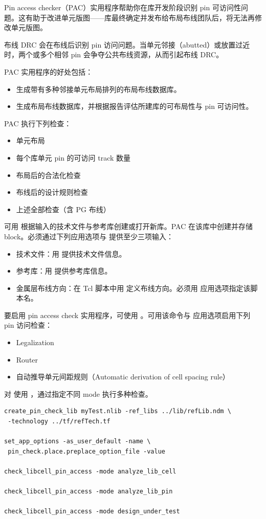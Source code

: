 Pin access checker（PAC）实用程序帮助你在库开发阶段识别 pin 可访问性问题。这有助于改进单元版图——库最终确定并发布给布局布线团队后，将无法再修改单元版图。

布线 DRC 会在布线后识别 pin 访问问题。当单元邻接（abutted）或放置过近时，两个或多个相邻 pin 会争夺公共布线资源，从而引起布线 DRC。

PAC 实用程序的好处包括：
\begin{itemize}
  \item 生成带有多种邻接单元布局排列的布局布线数据库。
  \item 生成布局布线数据库，并根据报告评估所建库的可布局性与 pin 可访问性。
\end{itemize}

PAC 执行下列检查：
\begin{itemize}
  \item 单元布局
  \item 每个库单元 pin 的可访问 track 数量
  \item 布局后的合法化检查
  \item 布线后的设计规则检查
  \item 上述全部检查（含 PG 布线）
\end{itemize}

可用  根据输入的技术文件与参考库创建或打开新库。PAC 在该库中创建并存储 block。必须通过下列应用选项与  提供至少三项输入：
\begin{itemize}
  \item 技术文件：用  提供技术文件信息。
  \item 参考库：用  提供参考库信息。
  \item 金属层布线方向：在 Tcl 脚本中用  定义布线方向。必须用  应用选项指定该脚本名。
\end{itemize}

要启用 pin access check 实用程序，可使用 。可用该命令与  应用选项启用下列 pin 访问检查：
\begin{itemize}
  \item Legalization
  \item Router
  \item 自动推导单元间距规则（Automatic derivation of cell spacing rule）
\end{itemize}

对  使用 ，通过指定不同 mode 执行多种检查。
\begin{lstlisting}
create_pin_check_lib myTest.nlib -ref_libs ../lib/refLib.ndm \
 -technology ../tf/refTech.tf

set_app_options -as_user_default -name \
 pin_check.place.preplace_option_file -value

check_libcell_pin_access -mode analyze_lib_cell

check_libcell_pin_access -mode analyze_lib_pin

check_libcell_pin_access -mode design_under_test
\end{lstlisting}

